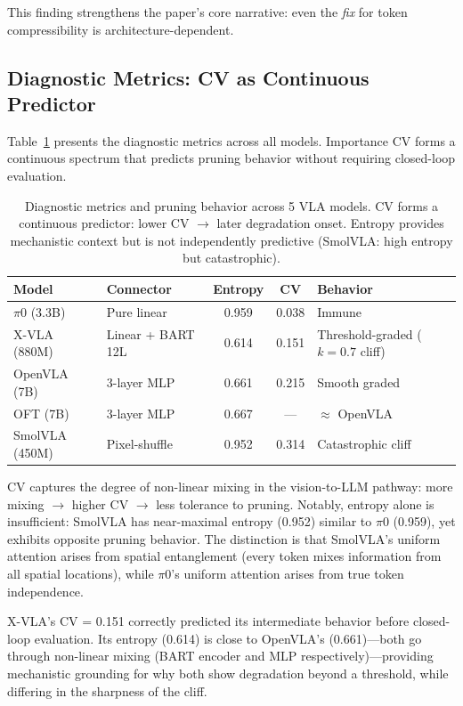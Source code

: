 \documentclass[letterpaper]{article}
\begin{document}
This finding strengthens the paper's core narrative: even the \emph{fix} for token compressibility is architecture-dependent.

\subsection{Diagnostic Metrics: CV as Continuous Predictor}
\label{sec:diagnostic}

Table~\ref{tab:diagnostics} presents the diagnostic metrics across all models. Importance CV forms a continuous spectrum that predicts pruning behavior without requiring closed-loop evaluation.

\begin{table}[t]
\centering
\caption{Diagnostic metrics and pruning behavior across 5 VLA models. CV forms a continuous predictor: lower CV $\to$ later degradation onset. Entropy provides mechanistic context but is not independently predictive (SmolVLA: high entropy but catastrophic).}
\label{tab:diagnostics}
\small
\begin{tabular}{@{}llccl@{}}
\toprule
\textbf{Model} & \textbf{Connector} & \textbf{Entropy} & \textbf{CV} & \textbf{Behavior} \\
\midrule
$\pi$0 (3.3B)   & Pure linear        & 0.959 & 0.038 & Immune \\
X-VLA (880M)     & Linear + BART 12L  & 0.614 & 0.151 & Threshold-graded ($k{=}0.7$ cliff) \\
OpenVLA (7B)     & 3-layer MLP        & 0.661 & 0.215 & Smooth graded \\
OFT (7B)         & 3-layer MLP        & 0.667 & ---   & $\approx$ OpenVLA \\
SmolVLA (450M)   & Pixel-shuffle      & 0.952 & 0.314 & Catastrophic cliff \\
\bottomrule
\end{tabular}
\end{table}

CV captures the degree of non-linear mixing in the vision-to-LLM pathway: more mixing $\to$ higher CV $\to$ less tolerance to pruning. Notably, entropy alone is insufficient: SmolVLA has near-maximal entropy (0.952) similar to $\pi$0 (0.959), yet exhibits opposite pruning behavior. The distinction is that SmolVLA's uniform attention arises from spatial entanglement (every token mixes information from all spatial locations), while $\pi$0's uniform attention arises from true token independence.

X-VLA's CV = 0.151 correctly predicted its intermediate behavior before closed-loop evaluation. Its entropy (0.614) is close to OpenVLA's (0.661)---both go through non-linear mixing (BART encoder and MLP respectively)---providing mechanistic grounding for why both show degradation beyond a threshold, while differing in the sharpness of the cliff.
\end{document}
